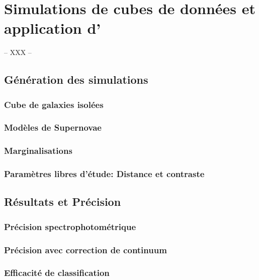 \documentclass[../main/main.tex]{subfiles}
\begin{document}
\setcounter{chapter}{7}
\chapter{Simulations de cubes de données et application d'\hypergal}\label{ch:res}

-- XXX --

\minitoc
\newpage

\section{Génération des simulations}

\subsection{Cube de galaxies isolées}

\subsection{Modèles de Supernovae}

\subsection{Marginalisations}

\subsection{Paramètres libres d'étude: Distance et contraste}

\section{Résultats et Précision}

\subsection{Précision spectrophotométrique}

\subsection{Précision avec correction de continuum}

\subsection{Efficacité de classification}
\end{document}
